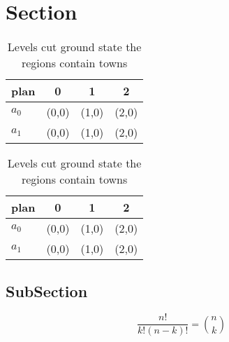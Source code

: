 \documentclass[a4paper]{article}
\begin{document}
\section{Section}

\begin{table}
\begin{adjustbox}{width=0.6\columnwidth}
\begin{tabular}{|l|l|l|l|}
\hline
\textbf{plan} & \multicolumn{1}{c|}{\textbf{0}} & \multicolumn{1}{c|}{\textbf{1}} & \multicolumn{1}{c|}{\textbf{2}} \\ \hline
\textbf{$a_0$}  & (0,0) & (1,0) & (2,0) \\ \hline
\textbf{$a_1$}  & (0,0) & (1,0) & (2,0) \\ \hline
\end{tabular}
\end{adjustbox}
\caption{Levels cut ground state the regions contain towns
}
\end{table}

\begin{table}
\begin{adjustbox}{width=0.6\columnwidth}
\begin{tabular}{|l|l|l|l|}
\hline
\textbf{plan} & \multicolumn{1}{c|}{\textbf{0}} & \multicolumn{1}{c|}{\textbf{1}} & \multicolumn{1}{c|}{\textbf{2}} \\ \hline
\textbf{$a_0$}  & (0,0) & (1,0) & (2,0) \\ \hline
\textbf{$a_1$}  & (0,0) & (1,0) & (2,0) \\ \hline
\end{tabular}
\end{adjustbox}
\caption{Levels cut ground state the regions contain towns
}
\end{table}

\subsection{SubSection}

\[ \frac{n!}{k!(n-k)!} = \binom{n}{k} \]
\end{document}

